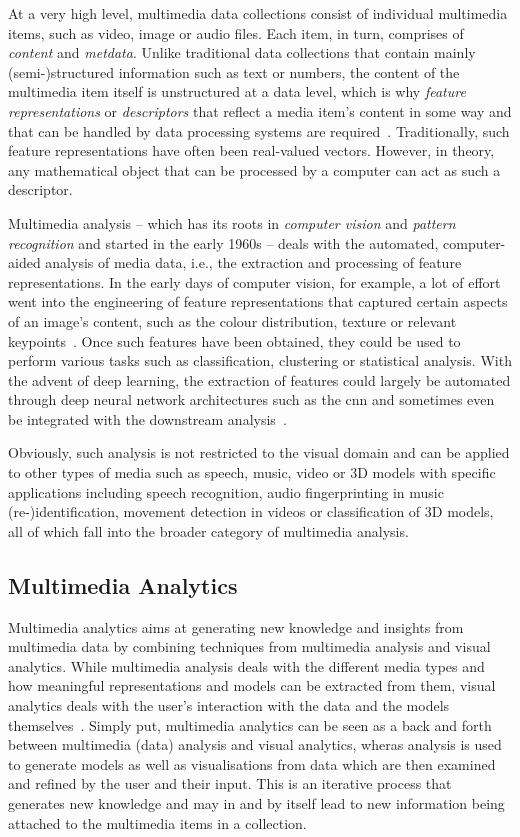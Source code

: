 At a very high level, multimedia data collections consist of individual multimedia items, such as video, image or audio files. Each item, in turn, comprises of \emph{content} and \emph{metdata}. Unlike traditional data collections that contain mainly (semi-)structured information such as text or numbers, the content of the multimedia item itself is unstructured at a data level, which is why \emph{feature representations} or \emph{descriptors} that reflect a media item's content in some way and that can be handled by data processing systems are required~\cite{Zahalka:2014towards}. Traditionally, such feature representations have often been real-valued vectors. However, in theory, any mathematical object that can be processed by a computer can act as such a descriptor. 

Multimedia analysis -- which has its roots in \emph{computer vision} and \emph{pattern recognition} and started in the early 1960s -- deals with the automated, computer-aided analysis of media data, i.e., the extraction and processing of feature representations. In the early days of computer vision, for example, a lot of effort went into the engineering of feature representations that captured certain aspects of an image's content, such as the colour distribution, texture or relevant keypoints~\cite{Lowe:1999object,Bay:2006surf}. Once such features have been obtained, they could be used to perform various tasks such as classification, clustering or statistical analysis. With the advent of deep learning, the extraction of features could largely be automated through deep neural network architectures such as the \acrfull{cnn} and sometimes even be integrated with the downstream analysis~\cite{Goodfellow:2016deep}. 

Obviously, such analysis is not restricted to the visual domain and can be applied to other types of media such as speech, music, video or 3D models with specific applications including speech recognition, audio fingerprinting in music (re-)identification, movement detection in videos or classification of 3D models, all of which fall into the broader category of multimedia analysis.

\subsection{Multimedia Analytics}

Multimedia analytics aims at generating new knowledge and insights from multimedia data by combining techniques from multimedia analysis and visual analytics. While multimedia analysis deals with the different media types and how meaningful representations and models can be extracted from them, visual analytics deals with the user's interaction with the data and the models themselves~\cite{Chinchor:2010Multimedia,Keim:2010mastering}. Simply put, multimedia analytics can be seen as a back and forth between multimedia (data) analysis and visual analytics, wheras analysis is used to generate models as well as visualisations from data which are then examined and refined by the user and their input. This is an iterative process that generates new knowledge and may in and by itself lead to new information being attached to the multimedia items in a collection.

